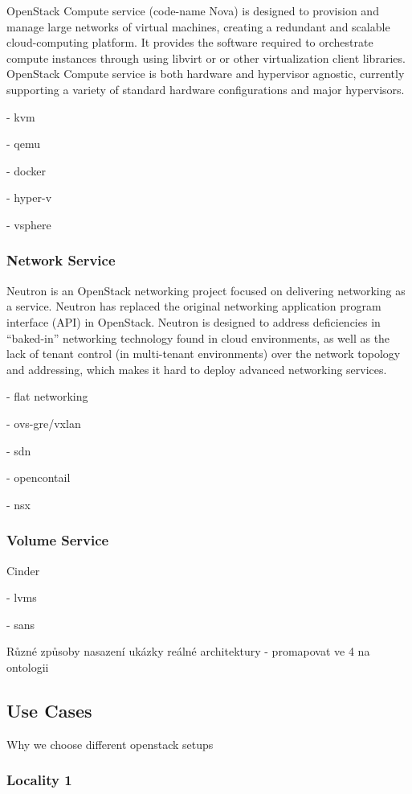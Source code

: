 OpenStack Compute service (code-name Nova) is designed to provision and manage large networks of virtual machines, creating a redundant and scalable cloud-computing platform.  It provides the software required to orchestrate compute instances through using libvirt or or other virtualization client libraries. OpenStack Compute service is both hardware and hypervisor agnostic, currently supporting a variety of standard hardware configurations and major hypervisors.

- kvm

- qemu

- docker

- hyper-v

- vsphere

\subsubsection{Network Service}

Neutron is an OpenStack networking project focused on delivering networking as a service. Neutron has replaced the original networking application program interface (API) in OpenStack. Neutron is designed to address deficiencies in “baked-in” networking technology found in cloud environments, as well as the lack of tenant control (in multi-tenant environments) over the network topology and addressing, which makes it hard to deploy advanced networking services.


- flat networking

- ovs-gre/vxlan

- sdn

  - opencontail
  
  - nsx

\subsubsection{Volume Service}

Cinder

- lvms

- sans

Různé způsoby nasazení ukázky reálné architektury - promapovat ve 4 na ontologii

\subsection{Use Cases}

Why we choose different openstack setups

\subsubsection{Locality 1}

